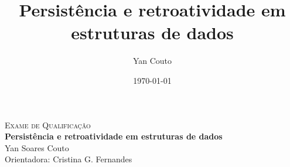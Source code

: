 \documentclass[11pt,oneside,a4paper, openany]{book}
\title{Persistência e retroatividade em estruturas de dados}
\author{Yan Couto}
\date{\today}
\begin{document}
\mainmatter

\begin{center}
	\textsc{Exame de Qualificação} \\[2ex]
	\textbf{\huge{Persistência e retroatividade em estruturas de dados}}\\[2ex]

	\Large{Yan Soares Couto} \\[2ex]

	Orientadora: Cristina G. Fernandes\\[5ex]
\end{center}














\end{document}
